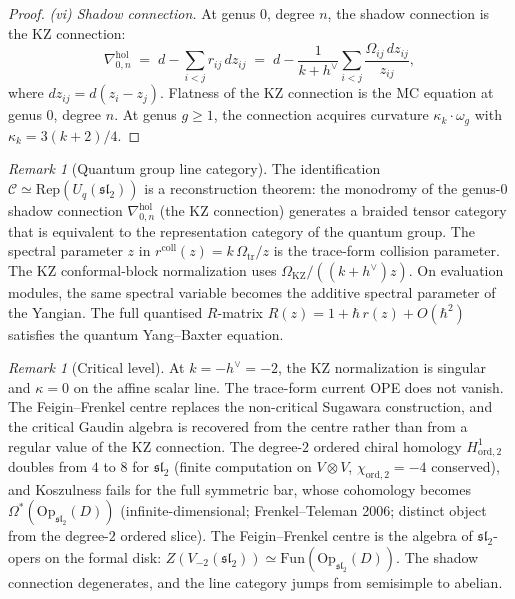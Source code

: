 \documentclass[11pt,reqno]{amsart}
\theoremstyle{definition}
\theoremstyle{remark}
\newtheorem{remark}[theorem]{Remark}
\newcommand{\cC}{\mathcal{C}}
\newcommand{\Rep}{\mathrm{Rep}}
\newcommand{\hol}{\mathrm{hol}}
\newcommand{\fsl}{\mathfrak{sl}}
\numberwithin{equation}{section}
\begin{document}
\begin{proof}
\smallskip\noindent\emph{(vi) Shadow connection.}\enspace
At genus $0$, degree $n$, the shadow connection is the KZ
connection:
\begin{equation}\label{eq:kz}
\nabla^{\hol}_{0,n}
\;=\;
d - \sum_{i < j} r_{ij}\,dz_{ij}
\;=\;
d - \frac{1}{k + h^\vee}\sum_{i < j}
\frac{\Omega_{ij}\,dz_{ij}}{z_{ij}},
\end{equation}
where $dz_{ij} = d(z_i - z_j)$. Flatness of the KZ connection
is the MC equation at genus $0$, degree $n$. At genus $g \geq 1$,
the connection acquires curvature
$\kappa_k \cdot \omega_g$ with
$\kappa_k = 3(k+2)/4$.
\end{proof}

\begin{remark}[Quantum group line category]\label{rem:km-qg}
The identification $\cC \simeq \Rep(U_q(\fsl_2))$ is a
reconstruction theorem: the monodromy of the genus-$0$ shadow
connection $\nabla^{\hol}_{0,n}$ (the KZ connection) generates a
braided tensor category that is equivalent to the representation
category of the quantum group. The spectral parameter $z$ in
$r^{\mathrm{coll}}(z)=k\,\Omega_{\mathrm{tr}}/z$ is the trace-form
collision parameter. The KZ conformal-block normalization uses
\(\Omega_{\mathrm{KZ}}/((k+h^\vee)z)\). On evaluation modules, the
same spectral variable becomes the additive spectral parameter of the
Yangian. The full quantised
$R$-matrix $R(z) = 1 + \hbar\,r(z) + O(\hbar^2)$ satisfies the
quantum Yang--Baxter equation.
\end{remark}

\begin{remark}[Critical level]\label{rem:critical}
At $k = -h^\vee = -2$, the KZ normalization is singular and
\(\kappa=0\) on the affine scalar line. The trace-form current OPE
does not vanish. The Feigin--Frenkel centre replaces the non-critical
Sugawara construction, and the critical Gaudin algebra is recovered
from the centre rather than from a regular value of the KZ connection.
The degree-$2$ ordered chiral homology $H^1_{\mathrm{ord}, 2}$
doubles from $4$ to $8$ for $\fsl_2$ \textup{(}finite computation on
$V \otimes V$, $\chi_{\mathrm{ord}, 2} = -4$ conserved\textup{)}, and
Koszulness fails for the full symmetric bar, whose cohomology
becomes $\Omega^*(\mathrm{Op}_{\fsl_2}(D))$
\textup{(}infinite-dimensional; Frenkel--Teleman 2006; distinct object from the
degree-$2$ ordered slice\textup{)}. The Feigin--Frenkel centre is the algebra of
$\fsl_2$-opers on the formal disk: $Z(V_{-2}(\fsl_2)) \simeq
\mathrm{Fun}(\mathrm{Op}_{\fsl_2}(D))$. The shadow connection
degenerates, and the line category jumps from semisimple to
abelian.
\end{remark}
\end{document}
